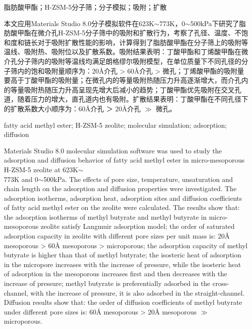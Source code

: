 \begin{cnabstract}{脂肪酸甲酯；H-ZSM-5分子筛；分子模拟；吸附；扩散}
\par{本文应用Materials Studio 8.0分子模拟软件在623K$\sim$773K，0$\sim$500kPa下研究了脂肪酸甲酯在微介孔H-ZSM-5分子筛中的吸附和扩散行为，考察了孔径、温度、不饱和度和链长对于吸附扩散性能的影响，计算得到了脂肪酸甲酯在分子筛上的吸附等温线、吸附热、吸附位以及扩散系数。吸附结果表明：丁酸甲酯和丁烯酸甲酯在微介孔分子筛内的吸附等温线均满足朗格缪尔吸附模型，在单位质量下不同孔径的分子筛内的饱和吸附量顺序为：20Å介孔 > 60Å介孔 > 微孔；丁烯酸甲酯的吸附量要高于丁酸甲酯的吸附量；在微孔内的等量吸附热随压力升高逐渐增大，而介孔内的等量吸附热随压力升高呈现先增大后减小的趋势；丁酸甲酯优先吸附在交叉孔道，随着压力的增大，直孔道内也有吸附。扩散结果表明：丁酸甲酯在不同孔径下的扩散系数大小顺序为：60Å介孔 ＞ 20Å介孔 $\gg$ 微孔。}
\end{cnabstract}

\begin{enabstract}{fatty acid methyl ester; H-ZSM-5 zeolite; molecular simulation; adsorption; diffusion}
\par{Materials Studio 8.0 molecular simulation software was used to study the adsorption and diffusion behavior of fatty acid methyl ester in micro-mesoporous H-ZSM-5 zeolite at 623K$\sim$\\773K and 0$\sim$500kPa. The effects of pore size, temperature, unsaturation and chain length on the adsorption and diffusion properties were investigated. The adsorption isotherms, adsorption heat, adsorption sites and diffusion coefficients of fatty acid methyl ester on the zeolite were calculated. The results show that: the adsorption isotherms of methyl butyrate and methyl butyrate in micro-mesoporous zeolite satisfy Langmuir adsorption model; the order of saturated adsorption capacity in zeolite with different pore sizes per unit mass is: 20Å mesoporous > 60Å mesoporous > microporous; the adsorption capacity of methyl butyrate is higher than that of methyl butyrate; the isosteric heat of adsorption in the micropore increases with the increase of pressure, while the isosteric heat of adsorption in the mesoporous increases first and then decreases with the increase of pressure; methyl butyrate is preferentially adsorbed in the cross-channel, with the increase of pressure, it is also adsorbed in the straight-channel. Diffusion results show that: the order of diffusion coefficients of methyl butyrate under different pore sizes is: 60Å mesoporous > 20Å mesoporous $\gg$ microporous.}
\end{enabstract}
